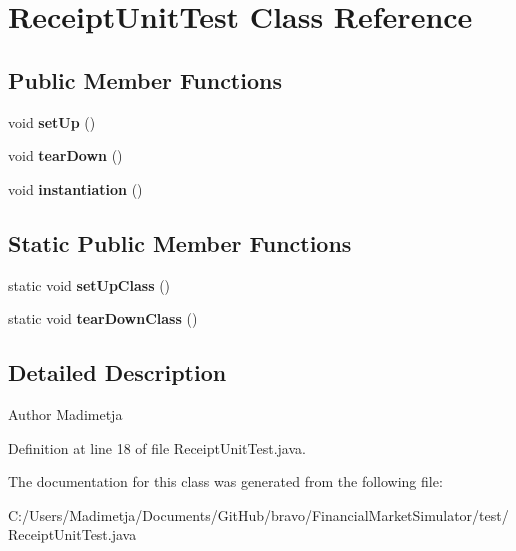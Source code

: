 \hypertarget{class_receipt_unit_test}{\section{Receipt\+Unit\+Test Class Reference}
\label{class_receipt_unit_test}
}
\subsection*{Public Member Functions}
\begin{DoxyCompactItemize}
\item 
\hypertarget{class_receipt_unit_test_aac78b41793c52301090b041a76a7990d}{void {\bfseries set\+Up} ()}\label{class_receipt_unit_test_aac78b41793c52301090b041a76a7990d}

\item 
\hypertarget{class_receipt_unit_test_af07963be2cea104cb428a55a6216fc68}{void {\bfseries tear\+Down} ()}\label{class_receipt_unit_test_af07963be2cea104cb428a55a6216fc68}

\item 
\hypertarget{class_receipt_unit_test_aab92fcc0a866db8ec56ed65b9693cdc8}{void {\bfseries instantiation} ()}\label{class_receipt_unit_test_aab92fcc0a866db8ec56ed65b9693cdc8}

\end{DoxyCompactItemize}
\subsection*{Static Public Member Functions}
\begin{DoxyCompactItemize}
\item 
\hypertarget{class_receipt_unit_test_a349b50a6df17f5b573210fab7cb7ed50}{static void {\bfseries set\+Up\+Class} ()}\label{class_receipt_unit_test_a349b50a6df17f5b573210fab7cb7ed50}

\item 
\hypertarget{class_receipt_unit_test_a16caf64de74462999a3e508979cb4438}{static void {\bfseries tear\+Down\+Class} ()}\label{class_receipt_unit_test_a16caf64de74462999a3e508979cb4438}

\end{DoxyCompactItemize}


\subsection{Detailed Description}
\begin{DoxyAuthor}{Author}
Madimetja 
\end{DoxyAuthor}


Definition at line 18 of file Receipt\+Unit\+Test.\+java.



The documentation for this class was generated from the following file\+:\begin{DoxyCompactItemize}
\item 
C\+:/\+Users/\+Madimetja/\+Documents/\+Git\+Hub/bravo/\+Financial\+Market\+Simulator/test/Receipt\+Unit\+Test.\+java\end{DoxyCompactItemize}

